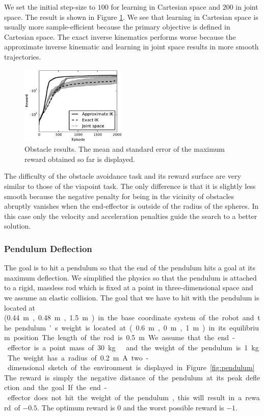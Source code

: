 \documentclass{article}
\begin{document}
We set the initial step-size to $100$ for learning in Cartesian space
and $200$ in joint space.
The result is shown in Figure \ref{fig:obstacle_res}. We see that
learning in Cartesian space is usually more sample-efficient because
the primary objective is defined in Cartesian space.
The exact inverse kinematics performs worse because the approximate
inverse kinematic and learning in joint space results in more smooth
trajectories.

\begin{figure}[tb]
\includegraphics[width=0.45\textwidth]{result_comparison_obstacle}
\centering
\caption{
Obstacle results. The mean and standard error of the maximum reward
obtained so far is displayed.
}
\label{fig:obstacle_res}
\end{figure}

The difficulty of the obstacle avoidance task and its reward surface
are very similar to those of the viapoint task. The only difference
is that it is slightly less smooth because the negative penalty
for being in the vicinity of obstacles abruptly vanishes when the
end-effector is outside of the radius of the spheres. In this case
only the velocity and acceleration penalties guide the search to a
better solution.

\subsubsection{Pendulum Deflection}

The goal is to hit a pendulum so that the end of the pendulum hits a goal at
its maximum deflection. We simplified the physics so that the pendulum is
attached to a rigid, massless rod which is fixed at a point in three-dimensional
space and we assume an elastic collision. The goal that we have to hit with
the pendulum is located at (\SI{0.44}\metre, \SI{0.48}\metre, \SI{1.5}\metre)
in the base coordinate system of the robot and the pendulum's weight is
located at (\SI{0.6}\metre, \SI{0}\metre, \SI{1}\metre) in its equilibrium position.
The length of the rod is \SI{0.5}\metre. We assume that the end-effector is
a point mass of \SI{30}\kilogram\ and the weight of the pendulum is
\SI{1}\kilogram. The weight has a radius of \SI{0.2}\metre. A two-dimensional
sketch of the environment is displayed in Figure \ref{fig:pendulum}.
The reward is simply the negative distance of the pendulum at its
peak deflection and the goal. If the end-effector does not hit the weight
of the pendulum, this will result in a reward of $-0.5$. The optimum reward
is $0$ and the worst possible reward is $-1$.
\end{document}
